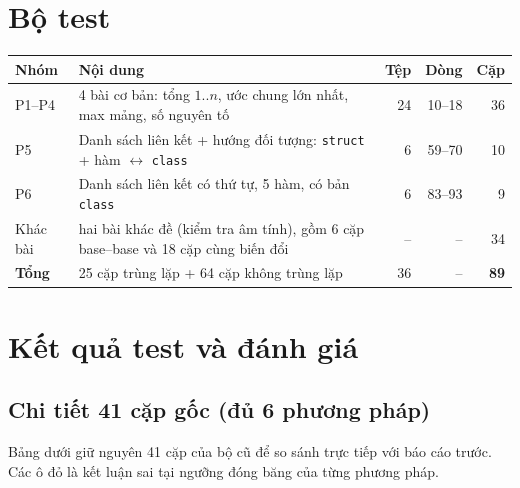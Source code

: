 \documentclass[11pt,a4paper]{article}
\begin{document}
\section{Bộ test}
\begin{center}
\small
\setlength{\tabcolsep}{6pt}
\begin{tabular}{llrrr}
\toprule
\textbf{Nhóm} & \textbf{Nội dung} & \textbf{Tệp} & \textbf{Dòng} & \textbf{Cặp} \\
\midrule
P1--P4 & 4 bài cơ bản: tổng $1..n$, ước chung lớn nhất, max mảng, số nguyên tố & 24 & 10--18 & 36 \\
P5    & Danh sách liên kết + hướng đối tượng: \texttt{struct} + hàm $\leftrightarrow$ \texttt{class} & 6 & 59--70 & 10 \\
P6    & Danh sách liên kết có thứ tự, 5 hàm, có bản \texttt{class} & 6 & 83--93 & 9 \\
Khác bài & hai bài khác đề (kiểm tra âm tính), gồm 6 cặp base--base và 18 cặp cùng biến đổi & -- & -- & 34 \\
\midrule
\textbf{Tổng} & 25 cặp trùng lặp + 64 cặp không trùng lặp & 36 & -- & \textbf{89} \\
\bottomrule
\end{tabular}
\end{center}

\section{Kết quả test và đánh giá}

\subsection{Chi tiết 41 cặp gốc (đủ 6 phương pháp)}
Bảng dưới giữ nguyên 41 cặp của bộ cũ để so sánh trực tiếp với báo cáo trước.
Các ô đỏ là kết luận sai tại ngưỡng đóng băng của từng phương pháp.
\end{document}
